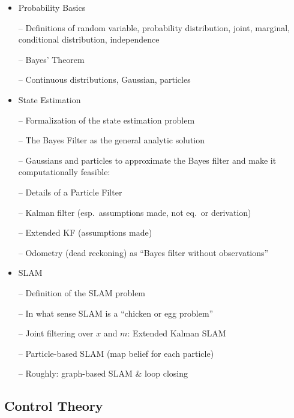 \begin{itemize}

\item Probability Basics

-- Definitions of random variable, probability distribution, joint,
marginal, conditional distribution, independence

-- Bayes' Theorem

-- Continuous distributions, Gaussian, particles

\item State Estimation

-- Formalization of the state estimation problem

-- The Bayes Filter as the general analytic solution

-- Gaussians and particles to approximate the Bayes filter and make it
computationally feasible:

-- Details of a Particle Filter

-- Kalman filter (esp.\ assumptions made, not eq.\ or derivation)

-- Extended KF (assumptions made)

-- Odometry (dead reckoning) as ``Bayes filter without observations''

\item SLAM

-- Definition of the SLAM problem

-- In what sense SLAM is a ``chicken or egg problem''

-- Joint filtering over $x$ and $m$: Extended Kalman SLAM

-- Particle-based SLAM (map belief for each particle)

-- Roughly: graph-based SLAM \& loop closing

\end{itemize}

\subsection{Control Theory}

